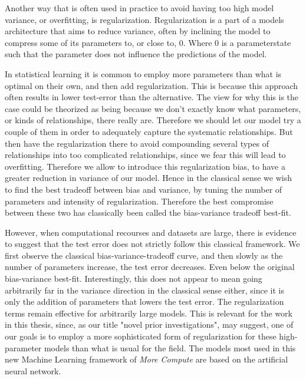 \documentclass[nofootinbib,UKenglish,nobalancelastpage,12pt]{article}
\begin{document}
Another way that is often used in practice to avoid having too high model variance, or overfitting, is regularization. Regularization is a part of a models architecture that aims to reduce variance, often by inclining the model to compress some of its parameters to, or close to, 0. Where 0 is a parameterstate such that the parameter does not influence the predictions of the model. 

In statistical learning it is common to employ more parameters than what is optimal on their own, and then add regularization. This is because this approach often results in lower test-error than the alternative. The view for why this is the case could be theorized as being because we don't exactly know what parameters, or kinds of relationships, there really are. Therefore we should let our model try a couple of them in order to adequately capture the systematic relationships. But then have the regularization there to avoid compounding several types of relationships into too complicated relationships, since we fear this will lead to overfitting. Therefore we allow to introduce this regularization bias, to have a greater reduction in variance of our model. Hence in the classical sense we wish to find the best tradeoff between bias and variance, by tuning the number of parameters and intensity of regularization. Therefore the best compromise between these two has classically been called the bias-variance tradeoff best-fit.

However, when computational recourses and datasets are large, there is evidence to suggest that the test error does not strictly follow this classical framework. We first observe the classical bias-variance-tradeoff curve, and then slowly as the number of parameters increase, the test error decreases. Even below the original bias-variance best-fit.\cite{Belkin_2019} Interestingly, this does not appear to mean going arbitrarily far in the variance direction in the classical sense either, since it is only the addition of parameters that lowers the test error. The regularization terms remain effective for arbitrarily large models. This is relevant for the work in this thesis, since, as our title "novel prior investigations", may suggest, one of our goals is to employ a more sophisticated form of regularization for these high-parameter models than what is usual for the field. The models most used in this new Machine Learning framework of \textit{More Compute} \cite{More_Compute} are based on the artificial neural network. \cite{LeCun1987}
\end{document}
